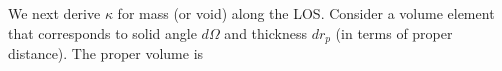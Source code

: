 We next derive $\kappa$ for mass (or void) along the LOS. Consider a volume element that corresponds to solid angle $d\Omega$ and thickness $dr_p$ (in terms of proper distance).  The proper volume is